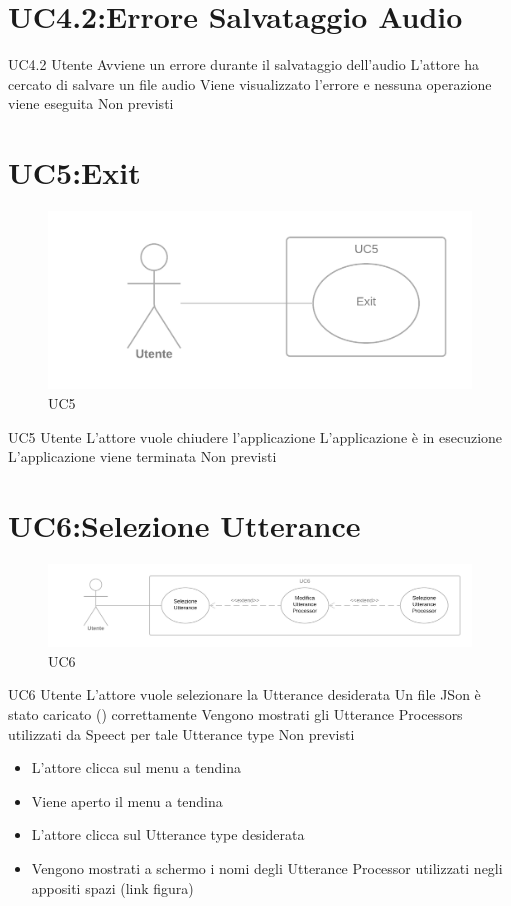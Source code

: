\documentclass[../AnalisideiRequisiti.tex]{subfiles}
\begin{document}
\section{UC4.2:Errore Salvataggio Audio}
\UserCase
{UC4.2}
{Utente}
{}
{Avviene un errore durante il salvataggio dell'audio}
{L'attore ha cercato di salvare un file audio}
{Viene visualizzato l'errore e nessuna operazione viene eseguita}
{Non previsti}
{}

\section{UC5:Exit}
\begin{figure}[H]
	\caption{UC5}
	\centering
	\includegraphics[width=\textwidth]{../img/UC05.png}
\end{figure}
\UserCase
{UC5}
{Utente}
{}
{L'attore vuole chiudere l'applicazione }
{L'applicazione è in esecuzione}
{L'applicazione viene terminata}
{Non previsti}
{
}

\section{UC6:Selezione Utterance}
\begin{figure}[H]
	\caption{UC6}
	\centering
	\includegraphics[width=\textwidth]{../img/UC06.png}
\end{figure}
\UserCase
{UC6}
{Utente}
{}
{L'attore vuole selezionare la Utterance desiderata}
{Un file JSon è stato caricato () correttamente }
{Vengono mostrati gli Utterance Processors utilizzati da Speect per tale Utterance type}
{Non previsti}
{
	\begin{itemize}
		\item{} L'attore clicca sul menu a tendina
		\item{} Viene aperto il menu a tendina
		\item{} L'attore clicca sul Utterance type desiderata
		\item{} Vengono mostrati a schermo i nomi degli Utterance Processor utilizzati negli appositi spazi (link figura)		
	\end{itemize}
}
\end{document}
